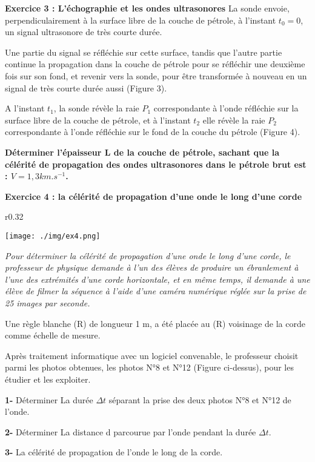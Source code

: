 \documentclass[12pt, french]{article}
\begin{document}
\begin{Box2}{\textbf{Exercice 3 :  L’échographie et les ondes ultrasonores  }}
La sonde envoie, perpendiculairement à la surface libre de la
couche de pétrole, à l’instant $t_0 = 0$, un signal ultrasonore de
très courte durée.

Une partie du signal se réfléchie sur cette surface, tandis que
l’autre partie continue la propagation dans la couche de
pétrole pour se réfléchir une deuxième fois sur son fond, et
revenir vers la sonde, pour être
transformée à nouveau
en un signal de très courte durée aussi (Figure 3).

A l’instant $t_1$, la sonde révèle la raie $P_1$ correspondante à
l’onde réfléchie sur la surface libre de la couche de pétrole,
et à l’instant $t_2$ elle révèle la raie $P_2$ correspondante à l’onde
réfléchie sur le fond de la couche du pétrole (Figure 4).


\textbf{Déterminer l’épaisseur L de la couche de pétrole, sachant que la célérité de propagation des ondes
ultrasonores dans le pétrole brut est : $V = 1,3 km.s^{-1}$.}
\end{Box2}



\begin{Box2}{\textbf{Exercice 4 : la célérité de propagation d’une onde le long d’une corde}}

\begin{wrapfigure}[11]{r}{0.32\textwidth}
  \begin{center}
	  \vspace{-0.5cm}
	\texttt{[image: ./img/ex4.png]}
  \end{center}
\end{wrapfigure}



\emph{Pour déterminer la célérité de propagation d’une onde le long d’une corde, le professeur de
physique demande à l’un des élèves de produire un ébranlement à l’une des extrémités d’une corde
horizontale, et en même temps, il demande à une élève de
filmer la séquence à l’aide d’une caméra numérique réglée sur
la prise de 25 images par seconde.}

Une règle blanche (R) de longueur 1 m, a été placée au
(R)
voisinage de la corde comme échelle de mesure.

Après traitement informatique avec un logiciel convenable, le
professeur choisit parmi les photos obtenues, les photos N°8 et
N°12 (Figure ci-dessus), pour les étudier et les exploiter.

\textbf{1- }Déterminer La durée $\Delta{t}$ séparant la prise des deux photos N°8 et N°12 de l’onde.

\textbf{2- }Déterminer La distance d parcourue par l’onde pendant la durée 
$\Delta{t}$. 

\textbf{3- }La célérité de propagation de l’onde le long de la corde.
\end{Box2}
\end{document}
